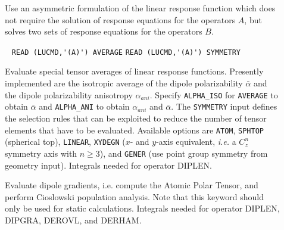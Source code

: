 \begin{center}
\end{center}

\begin{description}
\item[] 
Use an asymmetric formulation of the linear response function which
does not require the solution of response equations for the operators $A$, 
but solves two sets of response equations for the operators $B$.
%
%
%
\item[] \verb| |\newline
   \verb|READ (LUCMD,'(A)') AVERAGE|\newline
   \verb|READ (LUCMD,'(A)') SYMMETRY|

Evaluate special tensor averages of linear response functions.
Presently implemented are the isotropic average of the dipole polarizability
$\bar{\alpha}$ and the dipole polarizability anisotropy $\alpha_{ani}$.
Specify \verb+ALPHA_ISO+ for \verb+AVERAGE+ to obtain $\bar{\alpha}$ and
\verb+ALPHA_ANI+ to obtain $\alpha_{ani}$ and $\bar{\alpha}$.
The \verb+SYMMETRY+ input defines the selection rules that can be
exploited to reduce the number of tensor elements that have to be
evaluated. Available options are
\verb+ATOM+, \verb+SPHTOP+ (spherical top), \verb+LINEAR+,
\verb+XYDEGN+ ($x$- and $y$-axis equivalent, {\it i.e.\/} a $C_z^n$
symmetry axis with $n \ge 3$),  and \verb+GENER+ (use point
group symmetry from geometry input).
Integrals needed for operator DIPLEN.

\item[]
Evaluate dipole gradients, i.e. compute the Atomic Polar Tensor, and
perform Cioslowski population analysis. Note that this keyword should
only be used for static calculations.
Integrals needed for operator DIPLEN, DIPGRA, DEROVL, and DERHAM.
 

\end{description}
